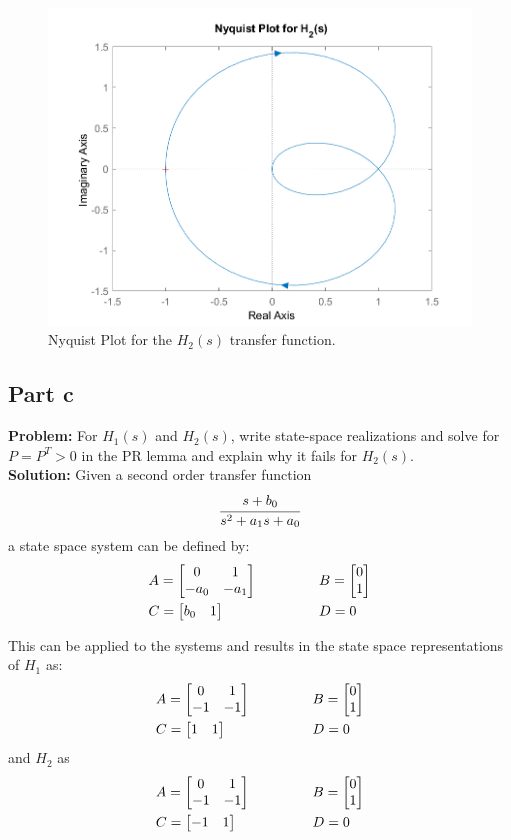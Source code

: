 \documentclass[letter]{article}
\begin{document}
\begin{figure}[p]
	\centering
	\includegraphics[width=0.7\linewidth]{fig/pblm2_H2}
	\caption{Nyquist Plot for the $H_2(s)$ transfer function.}
	\label{fig:pblm2h2}
\end{figure}

\newpage
\subsection{Part c}
\textbf{Problem:}
For $H_1(s)$ and $H_2(s)$, write state-space realizations and solve for $P=P^T > 0$ in the PR lemma and explain why it fails for $H_2(s)$.\\

\noindent
\textbf{Solution:}
Given a second order transfer function $$\cfrac{s + b_0}{s^2 + a_1 s + a_0}$$ a state space system can be defined by:
\begin{equation}
	\begin{aligned}
		&A = \mqty[0 &1\\ -a_0 &-a_1] \hspace{0.5in} &&B = \mqty[0\\ 1]\\
		&C = \mqty[b_0 & 1] \hspace{0.5in} &&D = 0
	\end{aligned}
\end{equation}

This can be applied to the systems and results in the state space representations of $H_1$ as:
\begin{equation}\label{eq:H_1}
	\begin{aligned}
		&A = \mqty[0 &1\\ -1 &-1] \hspace{0.5in} &&B = \mqty[0\\ 1]\\
		&C = \mqty[1 & 1] \hspace{0.5in} &&D = 0
	\end{aligned}
\end{equation}
and $H_2$ as
\begin{equation}\label{eq:H_2}
	\begin{aligned}
		&A = \mqty[0 &1\\ -1 &-1] \hspace{0.5in} &&B = \mqty[0\\ 1]\\
		&C = \mqty[-1 & 1] \hspace{0.5in} &&D = 0
	\end{aligned}
\end{equation}
\end{document}
